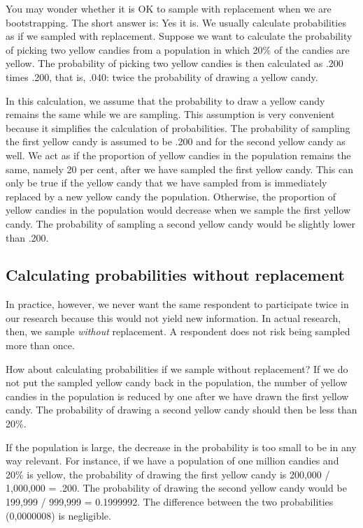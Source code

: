\documentclass[a4paper]{book}
\theoremstyle{definition}
\theoremstyle{definition}
\theoremstyle{definition}
\theoremstyle{remark}
\begin{document}
You may wonder whether it is OK to sample with replacement when we are
bootstrapping. The short answer is: Yes it is. We usually calculate
probabilities as if we sampled with replacement. Suppose we want to
calculate the probability of picking two yellow candies from a
population in which 20\% of the candies are yellow. The probability of
picking two yellow candies is then calculated as .200 times .200, that
is, .040: twice the probability of drawing a yellow candy.

In this calculation, we assume that the probability to draw a yellow
candy remains the same while we are sampling. This assumption is very
convenient because it simplifies the calculation of probabilities. The
probability of sampling the first yellow candy is assumed to be .200 and
for the second yellow candy as well. We act as if the proportion of
yellow candies in the population remains the same, namely 20 per cent,
after we have sampled the first yellow candy. This can only be true if
the yellow candy that we have sampled from is immediately replaced by a
new yellow candy the population. Otherwise, the proportion of yellow
candies in the population would decrease when we sample the first yellow
candy. The probability of sampling a second yellow candy would be
slightly lower than .200.

\subsection{Calculating probabilities without
replacement}\label{calculating-probabilities-without-replacement}

In practice, however, we never want the same respondent to participate
twice in our research because this would not yield new information. In
actual research, then, we sample \emph{without} replacement. A
respondent does not risk being sampled more than once.

How about calculating probabilities if we sample without replacement? If
we do not put the sampled yellow candy back in the population, the
number of yellow candies in the population is reduced by one after we
have drawn the first yellow candy. The probability of drawing a second
yellow candy should then be less than 20\%.

If the population is large, the decrease in the probability is too small
to be in any way relevant. For instance, if we have a population of one
million candies and 20\% is yellow, the probability of drawing the first
yellow candy is 200,000 / 1,000,000 = .200. The probability of drawing
the second yellow candy would be 199,999 / 999,999 = 0.1999992. The
difference between the two probabilities (0,0000008) is negligible.
\end{document}
